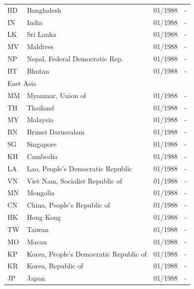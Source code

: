 \begin{small}
\begin{longtable}{p{0.5cm}p{9cm}p{2cm}p{2cm}}
BD	&	Bangladesh	&	01/1988	&	-	\\

IN	&	India	&	01/1988	&	-	\\

LK	&	Sri Lanka	&	01/1988	&	-	\\

MV	&	Maldives	&	01/1988	&	-	\\

NP	&	Nepal, Federal Democratic Rep.	&	01/1988	&	-	\\

BT	&	Bhutan	&	01/1988	&	-	\\

\midrule
\multicolumn{3}{l}{East Asia}	&	\\
MM	&	Myanmar, Union of	&	01/1988	&	-	\\

TH	&	Thailand	&	01/1988	&	-	\\

MY	&	Malaysia	&	01/1988	&	-	\\

BN	&	Brunei Darussalam	&	01/1988	&	-	\\

SG	&	Singapore	&	01/1988	&	-	\\

KH	&	Cambodia	&	01/1988	&	-	\\

LA	&	Lao, People's Democratic Republic	&	01/1988	&	-	\\

VN	&	Viet Nam, Socialist Republic of	&	01/1988	&	-	\\

MN	&	Mongolia	&	01/1988	&	-	\\

CN	&	China, People's Republic of	&	01/1988	&	-	\\

HK	&	Hong Kong	&	01/1988	&	-	\\

TW	&	Taiwan	&	01/1988	&	-	\\

MO	&	Macau	&	01/1988	&	-	\\

KP	&	Korea, People's Democratic Republic of	&	01/1988	&	-	\\

KR	&	Korea, Republic of	&	01/1988	&	-	\\

JP	&	Japan	&	01/1988	&	-	\\


\end{longtable}
\end{small}
